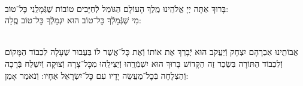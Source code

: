 \documentclass[twoside, openany, parskip=half, 11pt]{book}
\begin{document}
\newcommand{\hagomel}{
\begin{sometimes}

\instruction{ברכת הגומל:}\\
בָּרוּךְ אַתָּה יְיָ אֱלֹהֵֽינוּ מֶֽלֶךְ הָעוֹלָם הַגּוֹמֵל לְֿחַיָּבִים טוֹבוֹת שֶׁגְּֿמָלַֽנִי כׇּל־טוֹב:\\
\kahal
מִי שֶׁגְּֿמָלְֿךָ כׇּל־טוֹב הוּא יִגְמָלְֿךָ כׇּל־טוֹב סֶֽלָה:

\end{sometimes}}

\pesicha

\gadlu

\avharachamim

\vesigale


\torahbarachu

\hagomel

\vspace{-\baselineskip}

\\
אֲבוֹתֵֽינוּ אַבְרָהָם יִצְחָק וְֿיַעֲקֹב הוּא יְֿבָרֵךְ אֶת
אוֹתוֹ וְֿאֶת כׇּל־אֲשֶׁר לוֹ
בַּעֲבוּר שֶׁעָלָה לִכְבוֹד הַמָּקוֹם וְֿלִכְבוֹד הַתּוֹרָה
בִּשְׂכַר זֶה הַקָּדוֹשׁ בָּרוּךְ הוּא יִשְׁמְֿרֵֽהוּ וְֿיַצִּילֵֽהוּ מִכׇּל־צָרָה וְֿצוּקָה
וְֿיִשְׁלַח בְּֿרָכָה וְֿהַצְלָחָה בְּֿכׇל־מַעֲשֵׂה יָדָיו עִם כׇּל־יִשְׂרָאֵל אֶחָיו: וְֿנֹאמַר אָמֵן:
\end{document}
